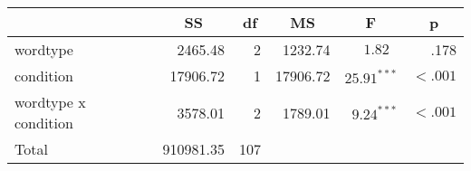 \begin{center}
\begin{tabular}{lrrrrr}
\toprule
 & \multicolumn{1}{c}{\textbf{SS}} & \multicolumn{1}{c}{\textbf{df}} & \multicolumn{1}{c}{\textbf{MS}} & \multicolumn{1}{c}{\textbf{F}} & \multicolumn{1}{c}{\textbf{p}} \\
\midrule
wordtype & 2465.48 & 2 & 1232.74 & $1.82^{   \ \ \ }$ & .178 \\
condition & 17906.72 & 1 & 17906.72 & $25.91^{***}$ & $< .001$ \\
wordtype x condition & 3578.01 & 2 & 1789.01 & $9.24^{***}$ & $< .001$ \\
\midrule
Total & 910981.35 & 107 \\
\bottomrule
\end{tabular}
\end{center}